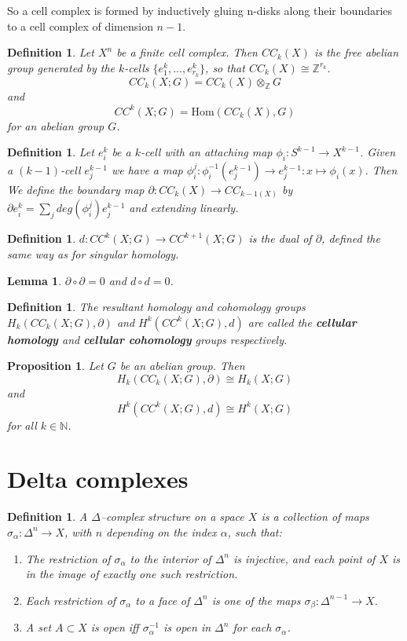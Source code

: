 \documentclass{article}
\newtheorem{definition}[theorem]{Definition}
\newtheorem{lemma}[theorem]{Lemma}
\newtheorem{proposition}[theorem]{Proposition}
\begin{document}
\noindent So a cell complex is formed by inductively gluing n-disks along their boundaries to a cell complex of dimension $n-1$.

\begin{definition}
Let $X^n$ be a finite cell complex. Then $CC_k(X)$ is the free abelian group generated by the $k$-cells $\{e^k_1,...,e^k_{r_k}\}$, so that $CC_k(X)\cong\mathbb{Z}^{r_k}$. \[CC_k(X;G)=CC_k(X)\otimes_\mathbb{Z}G\] and \[CC^k(X;G)=\text{Hom}(CC_k(X),G)\]for an abelian group $G$.
\end{definition}

\begin{definition}
Let $e_i^k$ be a $k$-cell with an attaching map $\phi_i\colon S^{k-1}\to X^{k-1}$. Given a $(k-1)$-cell $e_j^{k-1}$ we have a map $\phi_i^j:\phi_i^{-1}(e_j^{k-1})\to e_j^{k-1}:x\mapsto\phi_i(x)$. Then We define the boundary map $\partial\colon CC_k(X)\to CC_{k-1(X)}$ by $\partial e_i^k=\sum_jdeg(\phi_i^j)e_j^{k-1}$ and extending linearly.
\end{definition}

\begin{definition}
$d\colon CC^k(X;G)\to CC^{k+1}(X;G)$ is the dual of $\partial$, defined the same way as for singular homology.
\end{definition}

\begin{lemma}
$\partial\circ\partial=0$ and $d\circ d=0$.
\end{lemma}

\begin{definition}
The resultant homology and cohomology groups $H_k(CC_k(X;G),\partial)$ and $H^k(CC^k(X;G),d)$ are called the \textbf{cellular homology} and \textbf{cellular cohomology} groups respectively.
\end{definition}

\begin{proposition}
Let $G$ be an abelian group. Then\[H_k(CC_k(X;G),\partial)\cong H_k(X;G)\] and \[H^k(CC^k(X;G),d)\cong H^k(X;G)\] for all $k\in\mathbb{N}$.
\end{proposition}

\section{Delta complexes}
\begin{definition}
A $\Delta$--complex structure on a space $X$ is a collection of maps $\sigma_\alpha\colon\Delta^n\to X$, with $n$ depending on the index $\alpha$, such that:
\begin{enumerate}
    \item The restriction of $\sigma_\alpha$ to the interior of $\Delta^n$ is injective, and each point of $X$ is in the image of exactly one such restriction.
    \item Each restriction of $\sigma_\alpha$ to a face of $\Delta^n$ is one of the maps $\sigma_\beta\colon\Delta^{n-1}\to X$.
    \item A set $A\subset X$ is open iff $\sigma_\alpha^{-1}$ is open in $\Delta^n$ for each $\sigma_\alpha$.
\end{enumerate}
\end{definition}
\end{document}
